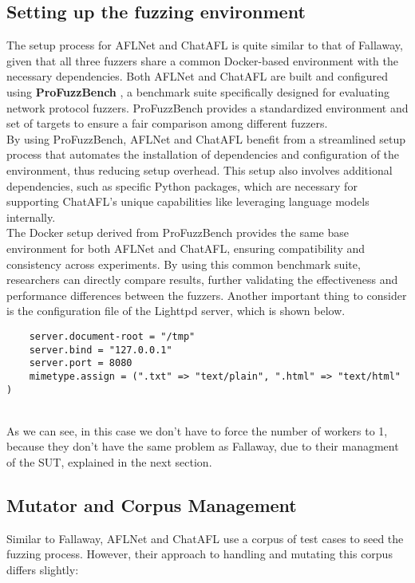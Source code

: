 \subsection{Setting up the fuzzing environment}

The setup process for AFLNet and ChatAFL is quite similar to that of Fallaway, given that all three fuzzers share a common Docker-based environment with the necessary dependencies. Both AFLNet and ChatAFL are built and configured using \textbf{ProFuzzBench} \cite{profuzzbench}, a benchmark suite specifically designed for evaluating network protocol fuzzers. ProFuzzBench provides a standardized environment and set of targets to ensure a fair comparison among different fuzzers.
\\By using ProFuzzBench, AFLNet and ChatAFL benefit from a streamlined setup process that automates the installation of dependencies and configuration of the environment, thus reducing setup overhead. This setup also involves additional dependencies, such as specific Python packages, which are necessary for supporting ChatAFL's unique capabilities like leveraging language models internally.
\\The Docker setup derived from ProFuzzBench provides the same base environment for both AFLNet and ChatAFL, ensuring compatibility and consistency across experiments. By using this common benchmark suite, researchers can directly compare results, further validating the effectiveness and performance differences between the fuzzers.
Another important thing to consider is the configuration file of the Lighttpd server, which is shown below.\\
\begin{lstlisting}
    server.document-root = "/tmp"
    server.bind = "127.0.0.1"
    server.port = 8080
    mimetype.assign = (".txt" => "text/plain", ".html" => "text/html" )
\end{lstlisting}
\phantom{}\\
As we can see, in this case we don't have to force the number of workers to 1, because they don't have the same problem as Fallaway, due to their managment of the SUT, explained in the next section.

\subsection{Mutator and Corpus Management}

Similar to Fallaway, AFLNet and ChatAFL use a corpus of test cases to seed the fuzzing process. However, their approach to handling and mutating this corpus differs slightly:

